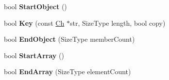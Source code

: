 \begin{DoxyCompactItemize}
\item 
bool {\bfseries Start\+Object} ()\hypertarget{class_generic_document_abb1417fde52cc34cb340e3b50a3295da}{}\label{class_generic_document_abb1417fde52cc34cb340e3b50a3295da}

\item 
bool {\bfseries Key} (const \hyperlink{class_generic_value_ade0e0ce64ccd5d852da57a35e720bafb}{Ch} $\ast$str, Size\+Type length, bool copy)\hypertarget{class_generic_document_a600d0950baabbcab11197cacb1459c7a}{}\label{class_generic_document_a600d0950baabbcab11197cacb1459c7a}

\item 
bool {\bfseries End\+Object} (Size\+Type member\+Count)\hypertarget{class_generic_document_a42f2df68f9c9d8b88a15b609716867d9}{}\label{class_generic_document_a42f2df68f9c9d8b88a15b609716867d9}

\item 
bool {\bfseries Start\+Array} ()\hypertarget{class_generic_document_ae12c513c61745ae731a47b1ca33db063}{}\label{class_generic_document_ae12c513c61745ae731a47b1ca33db063}

\item 
bool {\bfseries End\+Array} (Size\+Type element\+Count)\hypertarget{class_generic_document_a14097c833bed1a9c7be064ea619c887f}{}\label{class_generic_document_a14097c833bed1a9c7be064ea619c887f}


\end{DoxyCompactItemize}
